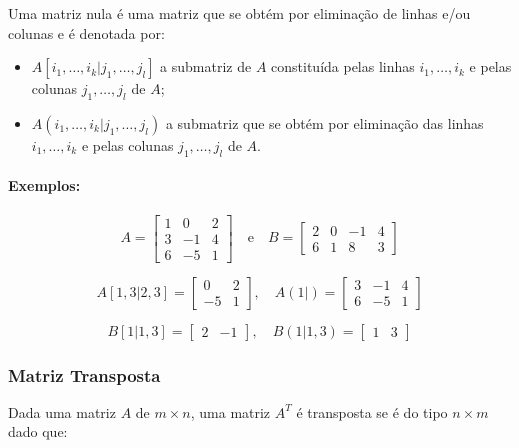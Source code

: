 Uma matriz nula é uma matriz que se obtém por
eliminação de linhas e/ou colunas e é denotada por:

\begin{itemize}
    \item \( A[i_1, \dots, i_k | j_1, \dots, j_l] \) a submatriz de \( A \) constituída pelas linhas \( i_1, \dots, i_k \) e pelas colunas \( j_1, \dots, j_l \) de \( A \);
    \item \( A(i_1, \dots, i_k | j_1, \dots, j_l) \) a submatriz que se obtém por eliminação das linhas \( i_1, \dots, i_k \) e pelas colunas \( j_1, \dots, j_l \) de \( A \).
\end{itemize}

\paragraph{Exemplos:}

\[
    A =
    \begin{bmatrix}
        1 & 0  & 2 \\
        3 & -1 & 4 \\
        6 & -5 & 1
    \end{bmatrix}
    \quad \text{e} \quad
    B =
    \begin{bmatrix}
        2 & 0 & -1 & 4 \\
        6 & 1 & 8  & 3
    \end{bmatrix}
\]

\[
    A[1,3 | 2,3] =
    \begin{bmatrix}
        0  & 2 \\
        -5 & 1
    \end{bmatrix},
    \quad
    A(1 | ) =
    \begin{bmatrix}
        3 & -1 & 4 \\
        6 & -5 & 1
    \end{bmatrix}
\]

\[
    B[1 | 1,3] =
    \begin{bmatrix}
        2 & -1
    \end{bmatrix},
    \quad
    B(1 | 1,3) =
    \begin{bmatrix}
        1 & 3
    \end{bmatrix}
\]

\subsubsection{Matriz Transposta}
\indent

Dada uma matriz $A$ de $m \times n$, uma matriz $A^T$ é transposta se é do tipo $n \times m$ dado que:

